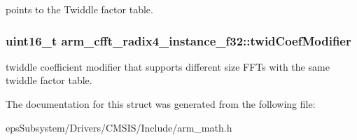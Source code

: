 points to the Twiddle factor table. \hypertarget{structarm__cfft__radix4__instance__f32_abe31ea2157dfa233e389cdfd3b9993ee}{
\subsubsection[{twid\-Coef\-Modifier}]{\setlength{\rightskip}{0pt plus 5cm}uint16\-\_\-t arm\-\_\-cfft\-\_\-radix4\-\_\-instance\-\_\-f32\-::twid\-Coef\-Modifier}}\label{structarm__cfft__radix4__instance__f32_abe31ea2157dfa233e389cdfd3b9993ee}
twiddle coefficient modifier that supports different size F\-F\-Ts with the same twiddle factor table. 

The documentation for this struct was generated from the following file\-:\begin{DoxyCompactItemize}
\item 
eps\-Subsystem/\-Drivers/\-C\-M\-S\-I\-S/\-Include/arm\-\_\-math.\-h\end{DoxyCompactItemize}
